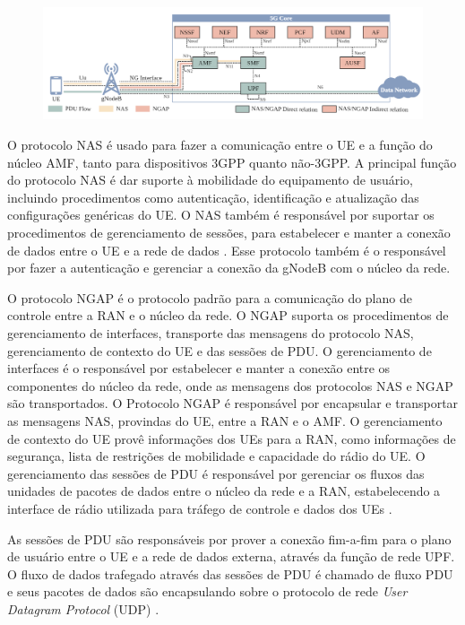 \begin{figure}[!ht]
    \centering
    \includegraphics[width=1\textwidth]{TG2/Chapters/Background/Figures/Background-5GSystemProtocols.png}
    \label{fig:5Gprotocols}
\end{figure}

O protocolo NAS é usado para fazer a comunicação entre o UE e a função do núcleo AMF, tanto para dispositivos 3GPP quanto não-3GPP. A principal função do protocolo NAS é dar suporte à mobilidade do equipamento de usuário, incluindo procedimentos como autenticação, identificação e atualização das configurações genéricas do UE. O NAS também é responsável por suportar os procedimentos de gerenciamento de sessões, para estabelecer e manter a conexão de dados entre o UE e a rede de dados \cite{3gpp.24.501}. Esse protocolo também é o responsável por fazer a autenticação e gerenciar a conexão da gNodeB com o núcleo da rede.

O protocolo NGAP é o protocolo padrão para a comunicação do plano de controle entre a RAN e o núcleo da rede. O NGAP suporta os procedimentos de gerenciamento de interfaces, transporte das mensagens do protocolo NAS, gerenciamento de contexto do UE e das sessões de PDU. O gerenciamento de interfaces é o responsável por estabelecer e manter a conexão entre os componentes do núcleo da rede, onde as mensagens dos protocolos NAS e NGAP são transportados. O Protocolo NGAP é responsável por encapsular e transportar as mensagens NAS, provindas do UE, entre a RAN e o AMF. O gerenciamento de contexto do UE provê informações dos UEs para a RAN, como informações de segurança, lista de restrições de mobilidade e capacidade do rádio do UE. O gerenciamento das sessões de PDU é responsável por gerenciar os fluxos das unidades de pacotes de dados entre o núcleo da rede e a RAN, estabelecendo a interface de rádio utilizada para tráfego de controle e dados dos UEs \cite{3gpp.38.413}.

As sessões de PDU são responsáveis por prover a conexão fim-a-fim para o plano de usuário entre o UE e a rede de dados externa, através da função de rede UPF.
O fluxo de dados trafegado através das sessões de PDU é chamado de fluxo PDU e seus pacotes de dados são encapsulando sobre o protocolo de rede \textit{User Datagram Protocol} (UDP) \cite{3gpp.38.415}.

